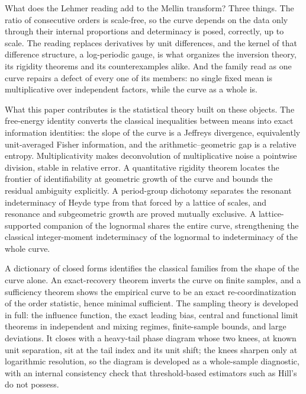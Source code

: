 \documentclass[sn-mathphys-num]{sn-jnl}
\theoremstyle{thmstyleone}%
\theoremstyle{thmstyletwo}%
\theoremstyle{thmstylethree}%
\theoremstyle{thmstyleone}%
\begin{document}
	What does the Lehmer reading add to the Mellin transform? Three
	things. The ratio of consecutive orders is scale-free, so the curve
	depends on the data only through their internal proportions and
	determinacy is posed, correctly, up to scale. The reading replaces
	derivatives by unit differences, and the kernel of that difference
	structure, a log-periodic gauge, is what organizes the inversion
	theory, its rigidity theorems and its counterexamples alike. And the
	family read as one curve repairs a defect of every one of its
	members: no single fixed mean is multiplicative over independent
	factors, while the curve as a whole is.
	
	What this paper contributes is the statistical theory built on these
	objects. The free-energy identity converts the classical
	inequalities between means into exact information identities: the
	slope of the curve is a Jeffreys divergence, equivalently
	unit-averaged Fisher information, and the arithmetic--geometric gap
	is a relative entropy. Multiplicativity makes deconvolution of
	multiplicative noise a pointwise division, stable in relative error.
	A quantitative rigidity theorem locates the frontier of
	identifiability at geometric growth of the curve and bounds the
	residual ambiguity explicitly. A period-group dichotomy separates
	the resonant indeterminacy of Heyde type from that forced by a
	lattice of scales, and resonance and subgeometric growth are proved
	mutually exclusive. A lattice-supported companion of the lognormal
	shares the entire curve, strengthening the classical integer-moment
	indeterminacy of the lognormal to indeterminacy of the whole curve.
	
	A dictionary of closed forms identifies the classical families from
	the shape of the curve alone. An exact-recovery theorem inverts the
	curve on finite samples, and a sufficiency theorem shows the
	empirical curve to be an exact re-coordinatization of the order
	statistic, hence minimal sufficient. The sampling theory is
	developed in full: the influence function, the exact leading bias,
	central and functional limit theorems in independent and mixing
	regimes, finite-sample bounds, and large deviations. It closes with
	a heavy-tail phase diagram whose two knees, at known unit
	separation, sit at the tail index and its unit shift; the knees
	sharpen only at logarithmic resolution, so the diagram is developed
	as a whole-sample diagnostic, with an internal consistency check
	that threshold-based estimators such as Hill's~\cite{hill1975} do
	not possess.
	
\end{document}
